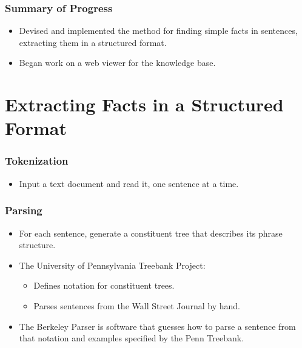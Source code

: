 \documentclass[mathserif]{beamer}
\begin{document}
  \begin{frame}

    \frametitle{Summary of Progress}

    \begin{itemize}[<+->]

      \item Devised and implemented the method for finding simple facts
      in sentences, extracting them in a structured format.


      \item Began work on a web viewer for the knowledge base.

    \end{itemize}

  \end{frame}

  \section{Extracting Facts in a Structured Format}
  \begin{frame}

    \frametitle{Tokenization}

    \begin{itemize}[<+->]

      \item Input a text document and read it, one sentence at a time.

    \end{itemize}

  \end{frame}

  \begin{frame}

    \frametitle{Parsing}

    \begin{itemize}[<+->]

      \item For each sentence, generate a constituent tree that describes its phrase structure.

      \item The University of Pennsylvania Treebank Project:
      \begin{itemize}[<+->]
        \item Defines notation for constituent trees.
        \item Parses sentences from the Wall Street Journal by hand.
      \end{itemize}

      \item The Berkeley Parser is software that guesses how to parse a sentence from that notation
      and examples specified by the Penn Treebank.

    \end{itemize}

  \end{frame}
\end{document}
